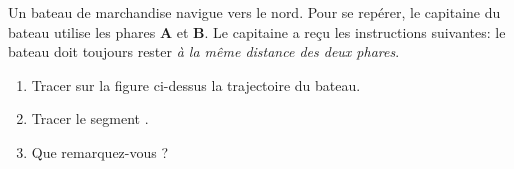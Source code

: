 \documentclass[activite]{thedocument}
\begin{document}
    \begingroup\small
    \begin{center}
    \end{center}
        Un bateau de marchandise navigue vers le nord. Pour se repérer, le capitaine du bateau utilise les phares \textsf{\textbf{A}} et \textsf{\textbf{B}}. Le capitaine a reçu les instructions suivantes: le bateau doit toujours rester \textit{à la même distance des deux phares}.
    \begin{enumerate}
        \item Tracer sur la figure ci-dessus la trajectoire du bateau.
        \item Tracer le segment {\sf[AB]}.
        \item Que remarquez-vous ?
    \end{enumerate}
    \endgroup
\end{document}
